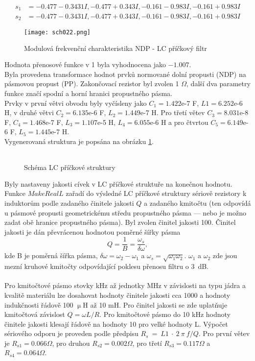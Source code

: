 \begin{align}
s_1 &= {-0.477 - 0.3431 I}, {-0.477 + 0.343 I}, {-0.161 - 0.983 I}, {-0.161 + 0.983 I}\\
s_2 &= {-0.477 - 0.3431 I}, {-0.477 + 0.343 I}, {-0.161 - 0.983 I}, {-0.161+ 0.983 I}
\end{align}
\begin{figure}[h]
\centering
\texttt{[image: sch022.png]}
\caption{Modulová frekvenční charakteristika NDP - LC příčkový filtr}
\end{figure}
\noindent Hodnota přenosové funkce v 1 byla vyhodnocena jako $-1.007$.\\
\noindent Byla provedena transformace hodnot prvků normované dolní propusti (NDP) na pásmovou propust (PP). Zakončovací rezistor byl zvolen 1 $\Omega$, další dva parametry funkce značí spodní a horní hranici propustného pásma.\\
Prvky v první větvi obvodu byly vyčísleny jako $C_1 = 1.422$e-7 F, $L1 = 6.252$e-6 H, v druhé větvi $C_2 = 6.135$e-6 F, $L_2 = 1.449$e-7 H. Pro třetí větev $C_3 = 8.031$e-8 F, $C_4 = 1.468$e-7 F, $L_3 = 1.107$e-5 H, $L_4 = 6.055$e-6 H a pro čtvrtou $C_5 = 6.149$e-6 F, $L_5 = 1.445$e-7 H.\\
\noindent Vygenerovaná struktura je popsána na obrázku \ref{s:SCHEM}.\\
\\
\begin{figure}[h]
\centering
{}
\caption{Schéma LC příčkové struktury \label{s:SCHEM}}
\end{figure}
\noindent Byly nastaveny jakosti cívek v LC příčkové struktuře na konečnou hodnotu. Funkce $MakeRealL$ zařadí do výsledné LC příčkové struktury sériově rezistory k induktorům podle zadaného činitele jakosti $Q$ a zadaného kmitočtu (ten odpovídá u pásmové propusti geometrickému středu propustného pásma --- nebo je možno zadat obě hranice propustného pásma). Byl zvolen činitel jakosti 100. Činitel jakosti je dán převrácenou hodnotou poměrné šířky pásma
\begin{equation}
Q = \frac{1}{B} = \frac{\omega_s}{\delta \omega},
\end{equation}
kde B je poměrná šířka pásma, $\delta \omega = \omega_2 - \omega_1$ a $\omega_s = \sqrt{\omega_1\omega_2}$. $\omega_1$ a $\omega_2$ zde jsou mezní kruhové kmitočty odpovídající poklesu přenosu filtru o 3~dB.\\
\\
Pro kmitočtové pásmo stovky kHz až jednotky MHz v závislosti na typu jádra a kvalitě materiálu lze dosahovat hodnoty činitele jakosti cca 1000 a hodnoty indukčnosti řádově 100 $\upmu$H až 10 mH. Pro činitel jakosti se zde uplatňuje kmitočtová závislost $Q = \omega L/R$. Pro kmitočtové pásmo do 10 kHz hodnoty činitele jakosti klesají řádově na hodnoty 10 pro velké hodnoty L. Výpočet sériového odporu je proveden podle předpisu $R_s~=~L1~\cdot~2~\pi~f/Q$. Pro první větev je $R_{s1} = 0.066 \Omega$, pro druhou $R_{s2} = 0.002 \Omega$, pro třetí $R_{s3} = 0.117 \Omega$ a $R_{s4} = 0.064 \Omega$.\\
